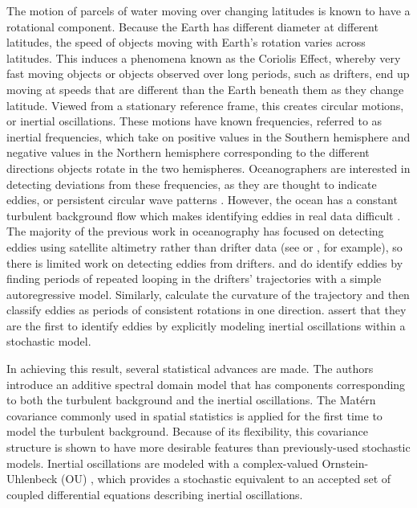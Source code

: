 \documentclass{stat572Style}
\newcommand{\vmadd}[1]{\textbf{\color{red}{#1}}}
\begin{document}
\par
The motion of parcels of water moving over changing latitudes is known to have a rotational component. 
Because the Earth has  different diameter at different latitudes, the speed of objects moving with Earth's rotation varies across latitudes.  
This induces a phenomena known as the Coriolis Effect, whereby very fast moving objects or objects observed over long periods, such as drifters, end up moving at speeds that are different than the Earth beneath them as they change latitude. 
Viewed from a stationary reference frame, this creates circular motions, or inertial oscillations. 
These motions have known frequencies, referred to as inertial frequencies, which take on positive values in the Southern hemisphere and negative values in the Northern hemisphere corresponding to the different directions objects rotate in the two hemispheres.
 Oceanographers  are interested in detecting deviations from these frequencies, as they are thought to indicate eddies, or persistent circular wave patterns \citep{Kunze1985}.
  However, the ocean has a constant turbulent background flow which makes identifying eddies in real data difficult \citep{ Elipot2010}.
 The majority of the previous work in oceanography has focused on detecting eddies using satellite altimetry rather than drifter data (see \citep{Isern2003} or \citep{Fu2010}, for example), so there is limited work on detecting eddies from drifters.
\citet{Shoosmith2005} and \citet{Lankhorst2006} do identify eddies by finding periods of repeated looping in the drifters' trajectories with a simple autoregressive model.
 Similarly, \citet{Boebel2003} calculate the curvature of the trajectory  and then classify eddies as periods of consistent rotations in one direction. 
 \citet{Sykulski2016} assert that they are the first to identify eddies by explicitly modeling inertial oscillations within a stochastic model.  
 \par
In achieving this result, several statistical advances are made.  
The authors introduce an additive spectral domain model that has components corresponding to both the turbulent background and the inertial oscillations. 
The Mat\'{e}rn covariance commonly used in spatial statistics \citep{Gneiting2012} is applied for the first time to model the turbulent background. 
Because of its flexibility, this covariance structure is shown to have more desirable features than previously-used stochastic models. 
Inertial oscillations are modeled with a complex-valued Ornstein-Uhlenbeck (OU) \vmadd{process} \citep{Arato1962, Jeffreys1968}, which provides a stochastic equivalent to an accepted set of coupled differential equations describing inertial oscillations. 
\end{document}
